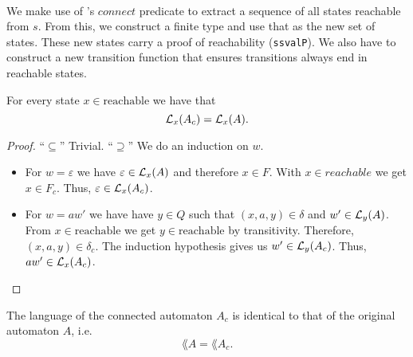    \paragraph{}
    We make use of \ssreflect's $connect$ predicate to extract a sequence of all states reachable from $s$. 
    From this, we construct a finite type and use that as the new set of states. 
    These new states carry a proof of reachability (\lstinline{ssvalP}).
    We also have to construct a new transition function that ensures transitions always end in reachable states.


    \begin{lemma}
        \label{dfa_connected_correct'}
        For every state $x \in \mathrm{reachable}$ we have that
        \begin{equation*}
            \mathcal{L}_{x}(A_c) = \mathcal{L}_{x}(A).
        \end{equation*}
    \end{lemma}
    \begin{proof}
        ``$\subseteq$'' Trivial.
        ``$\supseteq$''
        We do an induction on $w$.
        \begin{itemize}
            \item
                For $w = \varepsilon$ we have $\varepsilon \in \mathcal{L}_{x}(A)$ and therefore $x \in F$. 
                With $x \in reachable$ we get $x \in F_c$. 
                Thus, $\varepsilon \in \mathcal{L}_{x}(A_c)$.
            \item
                For $w = a w'$ we have have $y \in Q$ such that $(x, a, y) \in \delta$ and $w' \in \mathcal{L}_{y}(A)$.
                From $x \in \mathrm{reachable}$ we get $y \in \mathrm{reachable}$ by transitivity.
                Therefore, $(x,a,y) \in \delta_c$.
                The induction hypothesis gives us $w' \in \mathcal{L}_{y}(A_c)$. 
                Thus, $a w' \in \mathcal{L}_{x}(A_c)$.
        \end{itemize}
    \end{proof}

    \begin{theorem}
        \label{dfa_connected_correct}
        The language of the connected automaton $A_c$ is identical to that of the original automaton $A$, i.e.
        \begin{equation*}
            \lang{A} = \lang{A_c}.        
        \end{equation*}
    \end{theorem}

